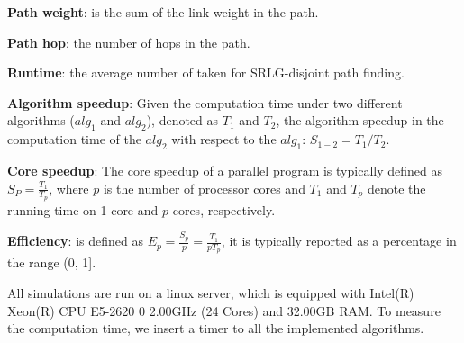 %
%

\textbf{Path weight}: is the sum of the link weight in the path.


 \textbf{Path hop}: the number of hops in the path.

\textbf{Runtime}: the average number of  taken for SRLG-disjoint path finding.


\textbf{Algorithm speedup}: Given the computation time under two different  algorithms ($alg_1$ and $alg_2$), denoted as $T_1$ and $T_2$, the algorithm speedup in the computation time of the $alg_2$ with respect to the $alg_1$: ${S_{1 - 2}} = T_1/T_2$.


 \textbf{Core speedup}: The core speedup \cite{grama2003introduction} of a parallel program is typically defined as $S_P=\frac{T_1}{T_p}$,
where $p$ is the number of processor cores and $T_1$ and $T_p$ denote the running time on 1 core and $p$ cores, respectively.


 \textbf{Efficiency}: is defined \cite{grama2003introduction} as $E_p=\frac{S_p}{p}=\frac{T_1}{pT_p}$,
it is typically reported as a percentage in the range (0, 1].




All simulations are run on a linux server, which is equipped with Intel(R) Xeon(R) CPU E5-2620 0 \@ 2.00GHz (24 Cores) and 32.00GB RAM. To measure the computation time, we insert a timer to all the implemented algorithms.







